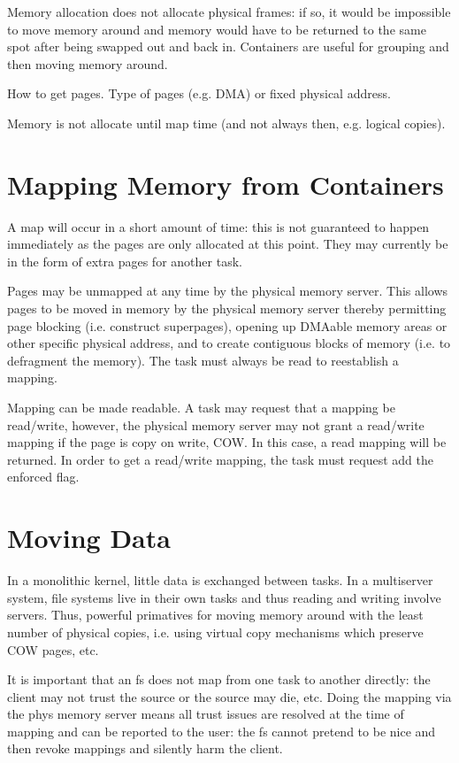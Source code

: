 Memory allocation does not allocate physical frames: if so, it would
be impossible to move memory around and memory would have to be
returned to the same spot after being swapped out and back in.
Containers are useful for grouping and then moving memory around.

How to get pages.  Type of pages (e.g. DMA) or fixed physical address.

Memory is not allocate until map time (and not always then,
e.g. logical copies).

\section{Mapping Memory from Containers}

A map will occur in a short amount of time: this is not guaranteed to
happen immediately as the pages are only allocated at this point.
They may currently be in the form of extra pages for another task.

Pages may be unmapped at any time by the physical memory server.  This
allows pages to be moved in memory by the physical memory server
thereby permitting page blocking (i.e. construct superpages), opening
up DMAable memory areas or other specific physical address, and to
create contiguous blocks of memory (i.e. to defragment the memory).
The task must always be read to reestablish a mapping.

Mapping can be made readable.  A task may request that a mapping be
read/write, however, the physical memory server may not grant a
read/write mapping if the page is copy on write, COW.  In this case, a
read mapping will be returned.  In order to get a read/write mapping,
the task must request add the enforced flag.

\section{Moving Data}

In a monolithic kernel, little data is exchanged between tasks.  In a
multiserver system, file systems live in their own tasks and thus
reading and writing involve servers.  Thus, powerful primatives for
moving memory around with the least number of physical copies,
i.e. using virtual copy mechanisms which preserve COW pages, etc.

It is important that an fs does not map from one task to another
directly: the client may not trust the source or the source may die,
etc.  Doing the mapping via the phys memory server means all trust
issues are resolved at the time of mapping and can be reported to the
user: the fs cannot pretend to be nice and then revoke mappings and
silently harm the client.

